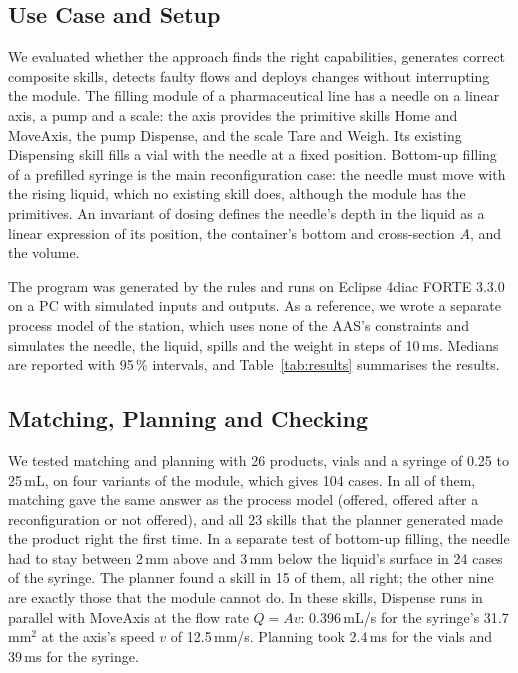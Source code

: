 \documentclass[5p,times,procedia]{elsarticle}
\begin{document}
\subsection{Use Case and Setup}

We evaluated whether the approach finds the right capabilities, generates correct composite skills, detects faulty flows and deploys changes without interrupting the module. The filling module of a pharmaceutical line has a needle on a linear axis, a pump and a scale: the axis provides the primitive skills Home and MoveAxis, the pump Dispense, and the scale Tare and Weigh. Its existing Dispensing skill fills a vial with the needle at a fixed position. Bottom-up filling of a prefilled syringe is the main reconfiguration case: the needle must move with the rising liquid, which no existing skill does, although the module has the primitives. An invariant of dosing defines the needle's depth in the liquid as a linear expression of its position, the container's bottom and cross-section $A$, and the volume.

The program was generated by the rules and runs on Eclipse 4diac FORTE 3.3.0 on a PC with simulated inputs and outputs. As a reference, we wrote a separate process model of the station, which uses none of the AAS's constraints and simulates the needle, the liquid, spills and the weight in steps of 10\,ms. Medians are reported with 95\,\% intervals, and Table~\ref{tab:results} summarises the results.

\subsection{Matching, Planning and Checking}

We tested matching and planning with 26 products, vials and a syringe of 0.25 to 25\,mL, on four variants of the module, which gives 104 cases. In all of them, matching gave the same answer as the process model (offered, offered after a reconfiguration or not offered), and all 23 skills that the planner generated made the product right the first time. In a separate test of bottom-up filling, the needle had to stay between 2\,mm above and 3\,mm below the liquid's surface in 24 cases of the syringe. The planner found a skill in 15 of them, all right; the other nine are exactly those that the module cannot do. In these skills, Dispense runs in parallel with MoveAxis at the flow rate $Q = Av$: 0.396\,mL/s for the syringe's 31.7\,mm$^2$ at the axis's speed $v$ of 12.5\,mm/s. Planning took 2.4\,ms for the vials and 39\,ms for the syringe.
\end{document}
